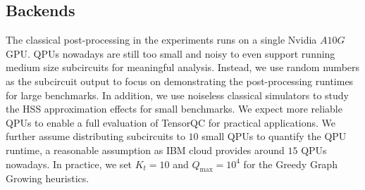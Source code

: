 \subsection{Backends}\label{sec:backends}
The classical post-processing in the experiments runs on a single Nvidia $A10G$ GPU.
QPUs nowadays are still too small and noisy to even support running medium size subcircuits for meaningful analysis.
Instead, we use random numbers as the subcircuit output to focus on demonstrating the post-processing runtimes for large benchmarks.
In addition, we use noiseless classical simulators to study the HSS approximation effects for small benchmarks.
We expect more reliable QPUs to enable a full evaluation of TensorQC for practical applications.
We further assume distributing subcircuits to $10$ small QPUs to quantify the QPU runtime,
a reasonable assumption as IBM cloud provides around $15$ QPUs nowadays.
In practice, we set $K_t=10$ and $Q_{\max}=10^4$ for the Greedy Graph Growing heuristics.